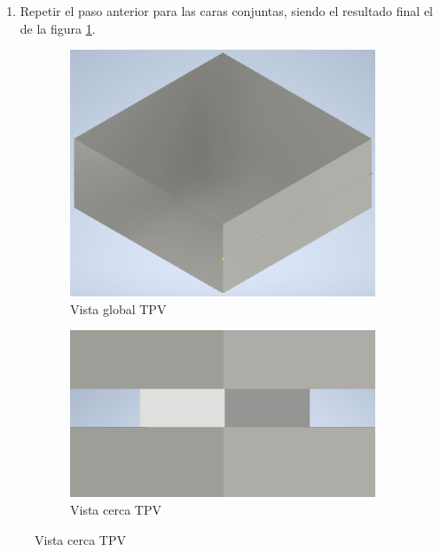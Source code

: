 \begin{enumerate}
\begin{enumerate}
		\item Repetir el paso anterior para las caras conjuntas, siendo el resultado final el de la figura \ref{fig:modelado3D_lejos}.
	\end{enumerate}
\begin{figure}[H]
	\centering
	\begin{subfigure}[b]{0.3\textwidth}
		\centering
			\includegraphics[width=1.00\textwidth]{figuras/Procedimiento_Simulaciones/Conduccion/modelado3D_lejos.png}
		\caption{Vista global TPV}
		\label{fig:modelado3D_lejos}
	\end{subfigure}
	\hfill
	\begin{subfigure}[b]{0.3\textwidth}
		\centering
			\includegraphics[width=1.00\textwidth]{figuras/Procedimiento_Simulaciones/Conduccion/modelado3D_cerca.png}
		\caption{Vista cerca TPV}
		\label{fig:modelado3D_cerca}
	\end{subfigure}

\end{figure}
\end{enumerate}
